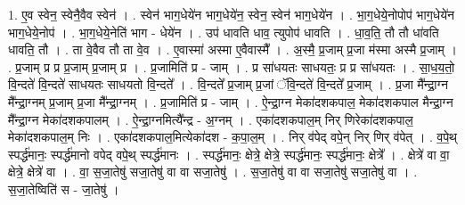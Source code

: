 \documentclass[17pt]{extarticle}
\begin{document}
1. ए॒व स्वेन॒ स्वेनै॒वैव स्वेन॑ । . स्वेन॑ भाग॒धेये॑न भाग॒धेये॑न॒ स्वेन॒ स्वेन॑ भाग॒धेये॑न । . भा॒ग॒धेये॒नोपोप॑ भाग॒धेये॑न भाग॒धेये॒नोप॑ । . भा॒ग॒धेये॒नेति॑ भाग - धेये॑न । . उप॑ धावति धाव॒ त्युपोप॑ धावति । . धा॒व॒ति॒ तौ तौ धा॑वति धावति॒ तौ । . ता वे॒वैव तौ ता वे॒व । . ए॒वास्मा॑ अस्मा ए॒वैवास्मै᳚ । . अ॒स्मै॒ प्र॒जाम् प्र॒जा म॑स्मा अस्मै प्र॒जाम् । . प्र॒जाम् प्र प्र प्र॒जाम् प्र॒जाम् प्र । . प्र॒जामिति॑ प्र - जाम् । . प्र सा॑धयतः साधयतः॒ प्र प्र सा॑धयतः । . सा॒ध॒य॒तो॒ वि॒न्दते॑ वि॒न्दते॑ साधयतः साधयतो वि॒न्दते᳚ । . वि॒न्दते᳚ प्र॒जाम् प्र॒जां ॅवि॒न्दते॑ वि॒न्दते᳚ प्र॒जाम् । . प्र॒जा मै᳚न्द्रा॒ग्न मै᳚न्द्रा॒ग्नम् प्र॒जाम् प्र॒जा मै᳚न्द्रा॒ग्नम् । . प्र॒जामिति॑ प्र - जाम् । . ऐ॒न्द्रा॒ग्न मेका॑दशकपाल॒ मेका॑दशकपाल मैन्द्रा॒ग्न मै᳚न्द्रा॒ग्न मेका॑दशकपालम् । . ऐ॒न्द्रा॒ग्नमित्यै᳚न्द्र - अ॒ग्नम् । . एका॑दशकपाल॒म् निर् णिरेका॑दशकपाल॒ मेका॑दशकपाल॒म् निः । . एका॑दशकपाल॒मित्येका॑दश - क॒पा॒ल॒म् । . निर् व॑पेद् वपे॒न् निर् णिर् व॑पेत् । . व॒पे॒थ् स्पर्द्ध॑मानः॒ स्पर्द्ध॑मानो वपेद् वपे॒थ् स्पर्द्ध॑मानः । . स्पर्द्ध॑मानः॒ क्षेत्रे॒ क्षेत्रे॒ स्पर्द्ध॑मानः॒ स्पर्द्ध॑मानः॒ क्षेत्रे᳚ । . क्षेत्रे॑ वा वा॒ क्षेत्रे॒ क्षेत्रे॑ वा । . वा॒ स॒जा॒तेषु॑ सजा॒तेषु॑ वा वा सजा॒तेषु॑ । . स॒जा॒तेषु॑ वा वा सजा॒तेषु॑ सजा॒तेषु॑ वा । . स॒जा॒तेष्विति॑ स - जा॒तेषु॑ । \newline
\end{document}
